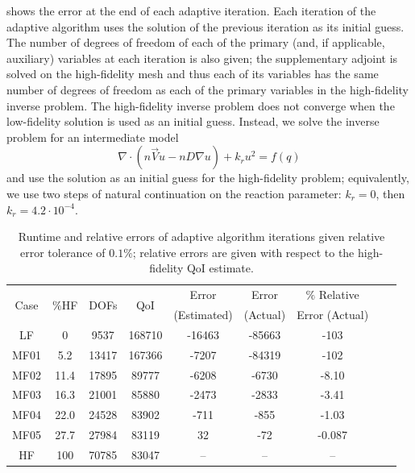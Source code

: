 \documentclass[review]{siamart0516}
\begin{document}
 shows the error at the end of each adaptive iteration. Each iteration of the adaptive algorithm uses the solution of the previous iteration as its initial guess. The number of degrees of freedom of each of the primary (and, if applicable, auxiliary) variables at each iteration is also given; the supplementary adjoint is solved on the high-fidelity mesh and thus each of its variables has the same number of degrees of freedom as each of the primary variables in the high-fidelity inverse problem. The high-fidelity inverse problem does not converge when the low-fidelity solution is used as an initial guess. Instead, we solve the inverse problem for an intermediate model
%
\begin{equation}
\nabla\cdot(n\vec{V}u - nD\nabla u) + k_ru^2 = f(q)
\end{equation}
%
and use the solution as an initial guess for the high-fidelity problem; equivalently, we use two steps of natural continuation on the reaction parameter: $k_r=0$, then $k_r=4.2\cdot10^{-4}$.
%
\begin{table}[htbp]
\caption{Runtime and relative errors of adaptive algorithm iterations given relative error tolerance of $0.1\%$; relative errors are given with respect to the high-fidelity QoI estimate.}
\label{tab:ref3D_diffmesh}
\centering
\begin{tabular}{|c|c|c|c|c|c|c|c|c|}
\hline
\multirow{2}{*}{Case} & \multirow{2}{*}{$\%$HF} & \multirow{2}{*}{DOFs} & \multirow{2}{*}{QoI} & Error & Error & $\%$ Relative \\
& & & & (Estimated) & (Actual) & Error (Actual)  \\ \hline
LF   & 0    & 9537  & 168710 & -16463 & -85663 & -103    \\
MF01 & 5.2  & 13417 & 167366 & -7207  & -84319 & -102    \\
MF02 & 11.4 & 17895 & 89777  & -6208  & -6730  & -8.10   \\
MF03 & 16.3 & 21001 & 85880  & -2473  & -2833  & -3.41   \\
MF04 & 22.0 & 24528 & 83902  & -711   & -855   & -1.03   \\
MF05 & 27.7 & 27984 & 83119  & 32     & -72    & -0.087  \\
HF   & 100  & 70785 & 83047  & --     & --     & --    \\ \hline
\end{tabular}
\end{table}
%
\end{document}
